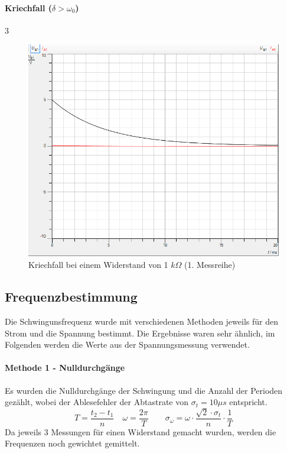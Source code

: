 \documentclass[a4paper, 11pt]{article}
\begin{document}
\paragraph{Kriechfall ($\delta > \omega_0$)} 3	
\begin{figure}[H]
	\centering
	\includegraphics[scale=0.5]{Kriechfall.png}
	\caption{Kriechfall bei einem Widerstand von 1 $k\Omega$ (1. Messreihe)}
	\label{fig:Kriechfall}
\end{figure}


\subsection{Frequenzbestimmung}
Die Schwingunsfrequenz wurde mit verschiedenen Methoden jeweils für den Strom und die Spannung bestimmt. Die Ergebnisse waren sehr ähnlich, im Folgenden werden die Werte aus der Spannungsmessung verwendet.

\paragraph{Methode 1 - Nulldurchgänge} Es wurden die Nulldurchgänge der Schwingung und die Anzahl der Perioden gezählt, wobei der Ablesefehler der Abtastrate von $\sigma_t = 10 \mu s$ entspricht.
\begin{equation}
T = \frac{t_2 - t_1}{n} \quad \omega = \frac{2\pi}{T} \qquad \sigma_\omega = \omega \cdot \frac{\sqrt{2} \cdot \sigma_t }{n} \cdot \frac{1}{T}
\end{equation}
Da jeweils 3 Messungen für einen Widerstand gemacht wurden, werden die Frequenzen noch gewichtet gemittelt.
\end{document}
